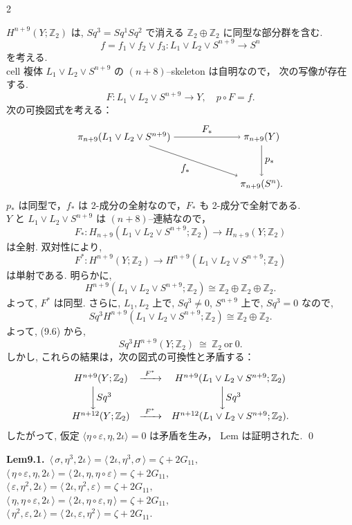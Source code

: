 \documentclass[10pt, leqno]{ltjsarticle}
\newcommand{\todas}[1]{\langle\,#1\,\rangle}
\newcommand{\pis}[2]{\pi_{#1}(#2)}       %
\newcommand{\z}{\mathbb{Z}}
\numberwithin{equation}{section}
\theoremstyle{plain}
\theoremstyle{definition}
\theoremstyle{remark}
\begin{document}
\begin{paracol}{2}

\noindent
\(H^{n+9}(Y;\z_2)\) は, $Sq^3=Sq^1Sq^2$ で消える
$\z_2\oplus\z_2$ に同型な部分群を含む. 
\[
f=f_1\vee f_2\vee f_3 :L_1\vee L_2\vee S^{n+9}\to S^n
\]
を考える.\\
cell 複体 $L_1\vee L_2\vee S^{n+9}$ の $(n+8)$–skeleton は自明なので，
次の写像が存在する.
\[
F:L_1\vee L_2\vee S^{n+9}\to Y,\quad p\circ F = f.
\]
次の可換図式を考える：
\[
\begin{tikzpicture}[baseline=(current bounding box.center)]
\node (A) at (0,1.7) {$\pis{n+9}{L_1\vee L_2\vee S^{n+9}}$};
\node (B) at (5,1.7) {$\pis{n+9}{Y}$};
\node (C) at (5,0) {$\pis{n+9}{S^n}.$};
\draw[->] (A) -- node[above] {$F_*$} (B);
\draw[->] (A) -- node[below left] {$f_*$} (C);
\draw[->] (B) -- node[right] {$p_*$} (C);
\end{tikzpicture}
\]
$p_*$ は同型で，$f_*$ は 2-成分の全射なので，$F_*$ も 2-成分で全射である. \\
$Y$ と $L_1\vee L_2\vee S^{n+9}$ は $(n+8)$–連結なので，
\[
F_* : H_{n+9}(L_1\vee L_2\vee S^{n+9}; \z_2)
\longrightarrow H_{n+9}(Y; \z_2)
\]
は全射.
双対性により, 
\[
F^*:H^{n+9}(Y;\mathbb Z_2)\longrightarrow
H^{n+9}(L_1\vee L_2\vee S^{n+9};\mathbb Z_2)
\]
は単射である. 明らかに,
\[
H^{n+9}(L_1\vee L_2\vee S^{n+9};\mathbb Z_2)\cong\mathbb Z_2\oplus\mathbb Z_2\oplus\mathbb Z_2 .
\]
よって, \(F^*\) は同型.
さらに,  $L_1,L_2$ 上で, \(Sq^{3}\ne0\),
\(S^{n+9}\) 上で, $Sq^3=0$ なので, 
\[
Sq^3 H^{n+9}(L_1\vee L_2\vee S^{n+9};\mathbb Z_2)\cong\mathbb Z_2\oplus\mathbb Z_2 .
\]
よって, (9.6) から, 
\[
Sq^3 H^{n+9}(Y;\mathbb Z_2)\ \cong\ \z_2\ \text{or}\ 0.
\]
しかし, これらの結果は，次の図式の可換性と矛盾する：
\[
\begin{array}{ccc}
H^{n+9}(Y;\mathbb Z_2) & \xrightarrow{\ F^*\ } & H^{n+9}(L_1\vee L_2\vee S^{n+9};\mathbb Z_2)\\[2pt]
\bigg\downarrow Sq^3 & & \bigg\downarrow Sq^3\\[-2pt]
H^{n+12}(Y;\mathbb Z_2) & \xrightarrow{\ F^*\ } & H^{n+12}(L_1\vee L_2\vee S^{n+9};\mathbb Z_2).
\end{array}
\]
したがって, 仮定 $\langle\eta\circ\varepsilon,\eta,2\iota\rangle=0$ は矛盾を生み，
 Lem は証明された. 
\qed

\switchcolumn

\noindent
\textbf{Lem9.1.}\
\(\todas{\sigma,\eta^{3},2\iota}=\todas{2\iota,\eta^{3},\sigma}=\zeta+2G_{11},\)\\
\(\todas{\eta\circ\varepsilon,\eta,2\iota}=\todas{2\iota,\eta,\eta\circ\varepsilon}=\zeta+2G_{11},\)\\
\(\todas{\varepsilon,\eta^{2},2\iota}=\todas{2\iota,\eta^{2},\varepsilon}=\zeta+2G_{11},\)\\
\(\todas{\eta,\eta\circ\varepsilon,2\iota}=\todas{2\iota,\eta\circ\varepsilon,\eta}=\zeta+2G_{11},\)\\
\(\todas{\eta^{2},\varepsilon,2\iota}=\todas{2\iota,\varepsilon,\eta^{2}}=\zeta+2G_{11}.\)


\end{paracol}
\end{document}
